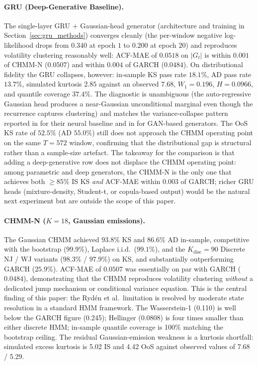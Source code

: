 \paragraph{GRU (Deep-Generative Baseline).}
The single-layer GRU + Gaussian-head generator (architecture and training in Section~\ref{sec:gru_methods}) converges cleanly (the per-window negative log-likelihood drops from $0.340$ at epoch $1$ to $0.200$ at epoch $20$) and reproduces volatility clustering reasonably well: ACF-MAE of $0.0518$ on $|G_t|$ is within $0.001$ of CHMM-N ($0.0507$) and within $0.004$ of GARCH ($0.0484$).
On distributional fidelity the GRU collapses, however: in-sample KS pass rate $18.1\%$, AD pass rate $13.7\%$, simulated kurtosis $2.85$ against an observed $7.68$, $W_1 = 0.196$, $H = 0.0966$, and quantile coverage $37.4\%$.
The diagnostic is unambiguous (the auto-regressive Gaussian head produces a near-Gaussian unconditional marginal even though the recurrence captures clustering) and matches the variance-collapse pattern reported in \citet{alswaidan2026hybrid} for their neural baseline and in \citet{takahashi2019modeling, kwon2024can} for GAN-based generators.
The OoS KS rate of $52.5\%$ (AD $55.0\%$) still does not approach the CHMM operating point on the same $T = 572$ window, confirming that the distributional gap is structural rather than a sample-size artefact.
The takeaway for the comparison is that adding a deep-generative row does not displace the CHMM operating point: among parametric and deep generators, the CHMM-N is the only one that achieves both $\geq 85\%$ IS KS \emph{and} ACF-MAE within $0.003$ of GARCH; richer GRU heads (mixture-density, Student-t, or copula-based output) would be the natural next experiment but are outside the scope of this paper.

\paragraph{CHMM-N ($K = 18$, Gaussian emissions).}
The Gaussian CHMM achieved $93.8\%$ KS and $86.6\%$ AD in-sample, competitive with the bootstrap ($99.9\%$), Laplace i.i.d.\ ($99.1\%$), and the $K_{\text{disc}} = 90$ Discrete NJ / WJ variants ($98.3\%$ / $97.9\%$) on KS, and substantially outperforming GARCH ($25.9\%$).
ACF-MAE of $0.0507$ was essentially on par with GARCH ($0.0484$), demonstrating that the CHMM reproduces volatility clustering \emph{without} a dedicated jump mechanism or conditional variance equation.
This is the central finding of this paper: the Ryd\'{e}n et al.\ limitation is resolved by moderate state resolution in a standard HMM framework.
The Wasserstein-1 (0.110) is well below the GARCH figure (0.245); Hellinger (0.0808) is four times smaller than either discrete HMM; in-sample quantile coverage is 100\% matching the bootstrap ceiling.
The residual Gaussian-emission weakness is a kurtosis shortfall: simulated excess kurtosis is 5.02 IS and 4.42 OoS against observed values of 7.68 / 5.29.

